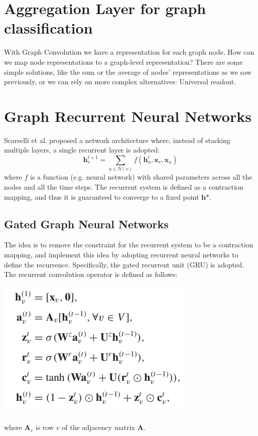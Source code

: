 \section{Aggregation Layer for graph classification}
With Graph Convolution we have a representation for each graph node. How can we map node representations to a graph-level representation? There are some simple solutions, like the sum or the average of nodes' representations as we saw previously, or we can rely on more complex alternatives: Universal readout.


\section{Graph Recurrent Neural Networks}
Scarselli et al. proposed a network architecture where, instead of stacking multiple layers, a single recurrent layer is adopted:
\[\textbf{h}_v^{t+1} = \sum_{u \in N(v)}f(\textbf{h}_u^t, \textbf{x}_v, \textbf{x}_u)\]
where $f$ is a function (e.g. neural network) with shared parameters across all the nodes and all the time steps. The recurrent system is defined as a contraction mapping, and thus it is guaranteed to converge to a fixed point $\textbf{h*}$.

\subsection{Gated Graph Neural Networks}
The idea is to remove the constraint for the recurrent system to be a contraction mapping, and implement this idea by adopting recurrent
neural networks to define the recurrence. Specifically, the gated recurrent unit (GRU) is adopted. The recurrent convolution operator is defined as follows:
\begin{center}
    \includegraphics[scale=0.8]{images/gated-gnn.png}
\end{center}
where $\textbf{A}_v$ is row $v$ of the adjacency matrix $\textbf{A}$.

